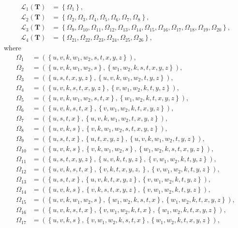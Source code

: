 \documentclass[superscriptaddress,onecolumn,nofootinbib,longbibliography,a4paper,accepted=2026-09-29]{quantumarticle}
\theoremstyle{plain}
\theoremstyle{definition}
\numberwithin{thm}{section}
\numberwithin{assumption}{section}
\numberwithin{lemma}{section}
\numberwithin{prop}{section}
\numberwithin{cor}{section}
\numberwithin{definition}{section}
\numberwithin{rmk}{section}
\numberwithin{equation}{section}
\newcommand{\lrcb}[1]{\left \{ #1 \right \}}
\newcommand{\mbf}{\mathbf{T}}
\begin{document}
\begin{itemize}
\begin{align}
\mathcal{L}_1(\mbf)&=\lrcb{\Omega_1},     \\
\mathcal{L}_2(\mbf)&=\lrcb{\Omega_2, \Omega_3, \Omega_4, \Omega_5, \Omega_6, \Omega_7, \Omega_8}, \\
\mathcal{L}_3(\mbf)&=\lrcb{\Omega_9, \Omega_{10}, \Omega_{11}, \Omega_{12}, \Omega_{13}, \Omega_{14}, \Omega_{15}, \Omega_{16}, \Omega_{17}, \Omega_{18}, \Omega_{19}, \Omega_{20}}, \\
\mathcal{L}_4(\mbf)&=\lrcb{ \Omega_{21}, \Omega_{22}, \Omega_{23},\Omega_{24}, \Omega_{25},\Omega_{26}},
\end{align}
where
\begin{align}
\Omega_1&=(\lrcb{u,v,k,w_1,w_2,s,t,x,y,z}), \\    
\Omega_2&=(\lrcb{u,v,k,w_1,w_2,s},\lrcb{w_1,w_2,k,s,t,x,y,z}), \\
\Omega_3&=(\lrcb{u,s,t,x,y,z},\lrcb{u,v,k,w_1,w_2,t,y,z}), \\
\Omega_4&=(\lrcb{u,v,k,s,t,x,y,z},\lrcb{v,w_1,w_2,k,t,y,z}), \\
\Omega_5&=(\lrcb{u,v,k,w_1,w_2,s,t,x}, \lrcb{w_1,w_2,k,t,x,y,z}), \\
\Omega_6&=(\lrcb{u,v,k,s,t,x}, \lrcb{v,w_1,w_2,k,t,x,y,z}), \\
\Omega_7&=(\lrcb{u,s,t,x}, \lrcb{u,v,k,w_1,w_2,t,x,y,z}), \\
\Omega_8&=(\lrcb{u,v,k,s}, \lrcb{v,k,w_1,w_2,s,t,x,y,z}), \\
\Omega_{9}&=(\lrcb{u,s,t,x}, \lrcb{u,t,x,y,z}, \lrcb{u,v,k,w_1,w_2,t,y,z}), \\
\Omega_{10}&=(\lrcb{u,v,k,s}, \lrcb{v,k,w_1,w_2,s}, \lrcb{w_1,w_2,k,s,t,x,y,z}), \\
\Omega_{11}&=(\lrcb{u,s,t,x,y,z}, \lrcb{u,v,k,t,y,z}, \lrcb{v,w_1,w_2,k,t,y,z}), \\
\Omega_{12}&=(\lrcb{u,v,k,s,t,x}, \lrcb{v,k,t,x,y,z,}, \lrcb{v,w_1,w_2,k,t,y,z}), \\
\Omega_{13}&=(\lrcb{u,s,t,x}, \lrcb{u,v,k,t,x,y,z}, \lrcb{v,w_1,w_2,k,t,y,z}), \\
\Omega_{14}&=(\lrcb{u,v,k,s}, \lrcb{v,k,s,t,x,y,z}, \lrcb{v,w_1,w_2,k,t,y,z}), \\
\Omega_{15}&=(\lrcb{u,v,k,w_1,w_2, s}, \lrcb{w_1,w_2,k,s,t,x}, \lrcb{w_1,w_2,k,t,x,y,z}), \\
\Omega_{16}&=(\lrcb{u,v,k,s,t,x}, \lrcb{v,w_1,w_2,k,t,x}, \lrcb{w_1,w_2,k,t,x, y,z}), \\
\Omega_{17}&=(\lrcb{u,v,k,s}, \lrcb{v,w_1,w_2,k,s,t,x}, \lrcb{w_1,w_2,k,t,x, y,z}), \\

\end{align}
\end{itemize}
\end{document}
